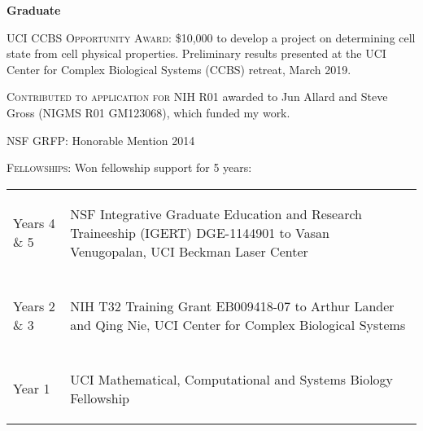 \documentclass[letterpaper,10pt]{article} %
\makeatletter
\newcommand\cellwidth{\TX@col@width}
\makeatother
\begin{document}
{\large \textbf{Graduate}}

\begin{description}[itemsep=-1ex]
\item \textsc{UCI CCBS Opportunity Award}: \$10,000 to develop a project on determining cell state from cell physical properties. Preliminary results presented at the UCI Center for Complex Biological Systems (CCBS) retreat, March 2019.
\item \textsc{Contributed to application for NIH R01} awarded to Jun Allard and Steve Gross (NIGMS R01 GM123068), which funded my work.
\item \textsc{NSF GRFP}: Honorable Mention 2014
\item \textsc{Fellowships}: Won fellowship support for 5 years:
\end{description}

\begin{tabularx}{\textwidth}{>{\raggedleft}p{} | X}

Years 4 \& 5 &
\begin{minipage}{\cellwidth}
\begin{description}[itemsep=.25ex,labelsep=0em]
\item NSF Integrative Graduate Education and Research Traineeship (IGERT) DGE-1144901 to Vasan Venugopalan, UCI Beckman Laser Center
\end{description}
\end{minipage} \\

\multicolumn{2}{c}{} \\

Years 2 \& 3 &
\begin{minipage}{\cellwidth}
\begin{description}[itemsep=.25ex,labelsep=0em]
\item NIH T32 Training Grant EB009418-07 to Arthur Lander and Qing Nie, UCI Center for Complex Biological Systems
\end{description}
\end{minipage} \\

\multicolumn{2}{c}{} \\

Year 1 &
\begin{minipage}{\cellwidth}
\begin{description}[itemsep=.25ex,labelsep=0em]
\item UCI Mathematical, Computational and Systems Biology Fellowship
\end{description}
\end{minipage}
\end{tabularx}
 
\end{document}

